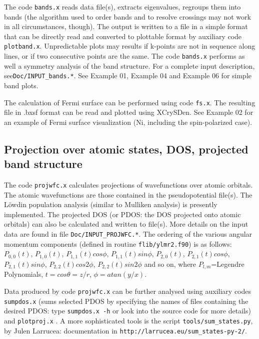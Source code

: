 \documentclass[12pt,a4paper]{article}
\begin{document}
The code \texttt{bands.x} reads data file(s), extracts eigenvalues,
regroups them into bands (the algorithm used to order bands and to resolve
crossings may not work in all circumstances, though). The output is written
to a file in a simple format that can be directly read and converted to
plottable format by auxiliary code
\texttt{plotband.x}. Unpredictable plots may results if k-points are not 
in sequence along lines, or if two consecutive points are the same. 
The code \texttt{bands.x} performs as well a 
symmetry analysis of the band structure. For a complete input description,
see\texttt{Doc/INPUT\_bands.*}. See Example 01, Example 04 and Example 06 
for simple band plots.

The calculation of Fermi surface can be performed using code \texttt{fs.x}.
The resulting file in .bxsf format can be read and plotted
using XCrySDen. See Example 02 for an example of Fermi surface 
visualization (Ni, including the spin-polarized case).

\subsection{Projection over atomic states, DOS, projected band structure}

The code \texttt{projwfc.x} calculates projections of wavefunctions
over atomic orbitals. The atomic wavefunctions are those contained
in the pseudopotential file(s). The L\"owdin population analysis (similar to
Mulliken analysis) is presently implemented. The projected DOS (or PDOS:
the DOS projected onto atomic orbitals) can also be calculated and written
to file(s). More details on the input data are found in file
\texttt{Doc/INPUT\_PROJWFC.*}. The ordering of the various 
angular momentum components (defined in routine \texttt{flib/ylmr2.f90})
is as follows:
$P_{0,0}(t)$, $P_{1,0}(t)$, $P_{1,1}(t)cos\phi$, $P_{1,1}(t)sin\phi$,
 $P_{2,0}(t)$, $P_{2,1}(t)cos\phi$, $P_{2,1}(t)sin\phi$, 
 $P_{2,2}(t)cos2\phi$, $P_{2,2}(t)sin2\phi$
and so on, where $P_{l,m}$=Legendre Polynomials, 
$t = cos\theta = z/r$, $\phi= atan(y /x)$.

Data produced by code \texttt{projwfc.x} can be further 
analysed using auxiliary codes \texttt{sumpdos.x} (sums selected PDOS
by specifying the names of files containing the desired PDOS: type 
\texttt{sumpdos.x -h} or look into the source code for more details) 
and \texttt{plotproj.x} . A more sophisticated tools is the script
\texttt{tools/sum\_states.py}, by Julen Larrucea: documentation in
\texttt{http://larrucea.eu/sum\_states-py-2/}.
\end{document}
